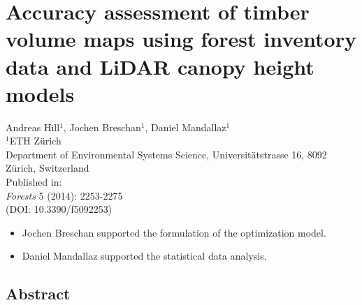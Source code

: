 \chapter{Accuracy assessment of timber volume maps using forest inventory data and LiDAR canopy height models}
\label{chap:mapp}
{\large Andreas Hill$^1$, Jochen Breschan$^1$, Daniel Mandallaz$^1$}\\

\vspace{3cm}
\noindent
$^1$ETH Z\"urich\\Department of Environmental Systems Science, Universit\"atstrasse 16, 8092 Z\"urich, Switzerland \\

\vspace{\fill}
\noindent
Published in:\\
\textit{Forests} 5 (2014): 2253-2275\\
(DOI: 10.3390/f5092253)

\newpage
\thispagestyle{plain}
\renewcommand{\labelitemi}{--}
\begin{itemize}
	\item Jochen Breschan supported the formulation of the optimization model.
	\item Daniel Mandallaz supported the statistical data analysis.
\end{itemize}

\clearpage

\clearpage
\section*{Abstract}
\label{chap:regmod:Abstract}


